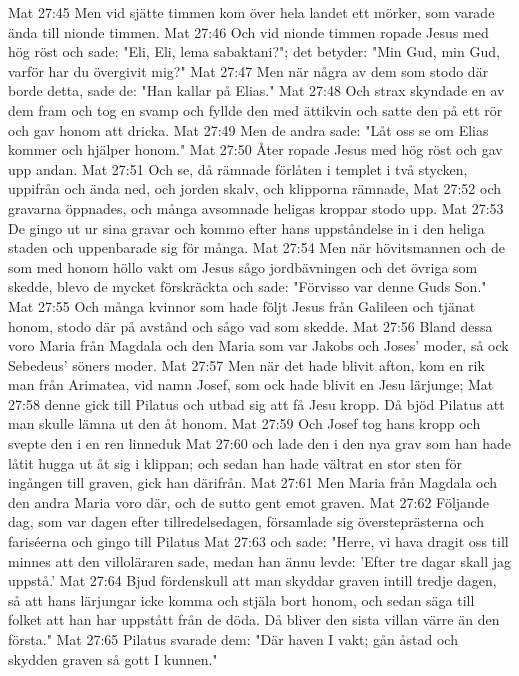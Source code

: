 Mat 27:45  Men vid sjätte timmen kom över hela landet ett mörker, som varade ända till nionde timmen.
Mat 27:46  Och vid nionde timmen ropade Jesus med hög röst och sade: "Eli, Eli, lema sabaktani?"; det betyder: "Min Gud, min Gud, varför har du övergivit mig?"
Mat 27:47  Men när några av dem som stodo där borde detta, sade de: "Han kallar på Elias."
Mat 27:48  Och strax skyndade en av dem fram och tog en svamp och fyllde den med ättikvin och satte den på ett rör och gav honom att dricka.
Mat 27:49  Men de andra sade: "Låt oss se om Elias kommer och hjälper honom."
Mat 27:50  Åter ropade Jesus med hög röst och gav upp andan.
Mat 27:51  Och se, då rämnade förlåten i templet i två stycken, uppifrån och ända ned, och jorden skalv, och klipporna rämnade,
Mat 27:52  och gravarna öppnades, och många avsomnade heligas kroppar stodo upp.
Mat 27:53  De gingo ut ur sina gravar och kommo efter hans uppståndelse in i den heliga staden och uppenbarade sig för många.
Mat 27:54  Men när hövitsmannen och de som med honom höllo vakt om Jesus sågo jordbävningen och det övriga som skedde, blevo de mycket förskräckta och sade: "Förvisso var denne Guds Son."
Mat 27:55  Och många kvinnor som hade följt Jesus från Galileen och tjänat honom, stodo där på avstånd och sågo vad som skedde.
Mat 27:56  Bland dessa voro Maria från Magdala och den Maria som var Jakobs och Joses' moder, så ock Sebedeus' söners moder.
Mat 27:57  Men när det hade blivit afton, kom en rik man från Arimatea, vid namn Josef, som ock hade blivit en Jesu lärjunge;
Mat 27:58  denne gick till Pilatus och utbad sig att få Jesu kropp. Då bjöd Pilatus att man skulle lämna ut den åt honom.
Mat 27:59  Och Josef tog hans kropp och svepte den i en ren linneduk
Mat 27:60  och lade den i den nya grav som han hade låtit hugga ut åt sig i klippan; och sedan han hade vältrat en stor sten för ingången till graven, gick han därifrån.
Mat 27:61  Men Maria från Magdala och den andra Maria voro där, och de sutto gent emot graven.
Mat 27:62  Följande dag, som var dagen efter tillredelsedagen, församlade sig översteprästerna och fariséerna och gingo till Pilatus
Mat 27:63  och sade: "Herre, vi hava dragit oss till minnes att den villoläraren sade, medan han ännu levde: 'Efter tre dagar skall jag uppstå.'
Mat 27:64  Bjud fördenskull att man skyddar graven intill tredje dagen, så att hans lärjungar icke komma och stjäla bort honom, och sedan säga till folket att han har uppstått från de döda. Då bliver den sista villan värre än den första."
Mat 27:65  Pilatus svarade dem: "Där haven I vakt; gån åstad och skydden graven så gott I kunnen."
